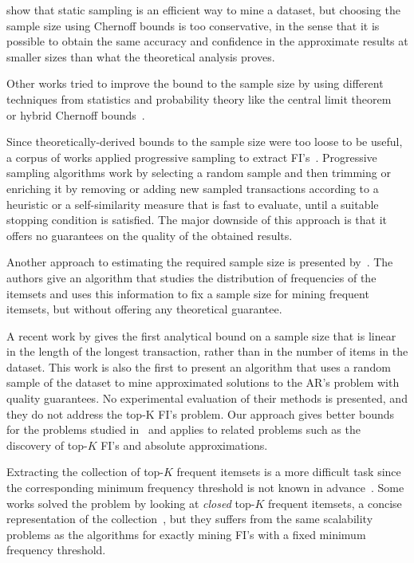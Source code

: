 \citet{ZakiPLO97} show that static sampling is an efficient way to
mine a dataset, but choosing the sample size using Chernoff bounds is too
conservative, in the sense that it is possible to obtain the same accuracy and
confidence in the approximate results at smaller sizes than what the theoretical
analysis proves. 

Other works tried to improve the bound to the sample size by using different
techniques from statistics and probability theory like the central limit
theorem~\citep{ZhangZW03,LiG04,JiaL05} or hybrid Chernoff
bounds~\citep{ZhaoZZ06}.

Since theoretically-derived bounds to the sample size were too loose to be
useful, a corpus of works applied progressive sampling to extract
FI's~\citep{JohnL96,ChenHS02,Parthasarathy02,BronnimanCDHS03,ChuangCY05,JiaG05,WangDC05,HwangK06,HuY06,MahafzahABAZ09,ChenHH11,ChandraB11}.
Progressive sampling algorithms work by selecting a random sample and then
trimming or enriching it by removing or adding new sampled transactions
according to a heuristic or a self-similarity measure that is fast to evaluate,
until a suitable stopping condition is satisfied. The major downside of this
approach is that it offers no guarantees on the quality of the obtained results.

Another approach to estimating the required sample size is presented
by~\citet{ChuangHC08}. The authors give an algorithm that studies the
distribution of frequencies of the itemsets and uses this information to fix a
sample size for mining frequent itemsets, but without offering any theoretical
guarantee.

A recent work by \citet{ChakaravarthyPS09} gives the first
analytical bound on a sample size that is linear in the length of the longest
transaction, rather than in the number of items in the dataset.  This work is
also the first to present an algorithm that uses a random sample of the dataset
to mine approximated solutions to the AR's problem with quality guarantees. No
experimental evaluation of their methods is presented, and they do not address
the top-K FI's problem. Our approach gives better bounds for the problems
studied in~\citep{ChakaravarthyPS09} and applies to related problems such as the
discovery of top-$K$ FI's and absolute approximations.

Extracting the collection of top-$K$ frequent itemsets is a more difficult task
since the corresponding minimum frequency threshold is not known in
advance~\citep{CheungF04,FuKT00}. Some works solved the problem by looking at
\emph{closed} top-$K$ frequent itemsets, a concise representation of the
collection~\citep{WangHLT05,PietracaprinaV07}, but they suffers from the same
scalability problems as the algorithms for exactly mining FI's with a fixed
minimum frequency threshold.

